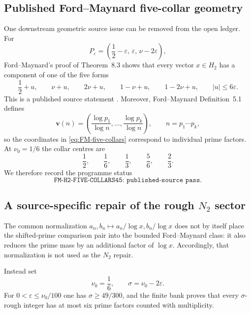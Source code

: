 \documentclass[11pt]{article}
\theoremstyle{definition}
\newcommand{\1}{\mathbf 1}
\begin{document}
\subsection{Published Ford--Maynard five-collar geometry}
One downstream geometric source issue can be removed from the open ledger.
For
\[
   P_\varepsilon=
   \left(\frac12-\varepsilon,\,
         \varepsilon,\,
         \nu-2\varepsilon\right),
\]
Ford--Maynard's proof of Theorem~8.3 shows that every vector
$x\in H_2$ has a component of one of the five forms
\begin{equation}
 \frac12+u,\qquad
 \nu+u,\qquad
 2\nu+u,\qquad
 1-\nu+u,\qquad
 1-2\nu+u,
 \qquad |u|\le 6\varepsilon.
 \label{eq:FM-five-collars}
\end{equation}
This is a published source statement \cite{FordMaynard2024}.  Moreover,
Ford--Maynard Definition~5.1 defines
\[
   \mathbf v(n)=
   \left(
     \frac{\log p_1}{\log n},\ldots,
     \frac{\log p_k}{\log n}
   \right),
   \qquad n=p_1\cdots p_k,
\]
so the coordinates in \eqref{eq:FM-five-collars} correspond to individual
prime factors.  At $\nu_0=1/6$ the collar centres are
\[
   \frac12,\qquad \frac16,\qquad \frac13,\qquad
   \frac56,\qquad \frac23.
\]
We therefore record the programme status
\[
   \boxed{\texttt{FM-H2-FIVE-COLLARS45: published-source pass}.}
\]

\subsection{A source-specific repair of the rough \texorpdfstring{$N_2$}{N2} sector}
The common normalization $a_n,b_n\mapsto a_n/\log x,b_n/\log x$ does not by
itself place the shifted-prime comparison pair into the bounded Ford--Maynard
class: it also reduces the prime mass by an additional factor of $\log x$.
Accordingly, that normalization is not used as the $N_2$ repair.

Instead set
\[
   \nu_0=\frac16,\qquad \sigma=\nu_0-2\varepsilon.
\]
For $0<\varepsilon\le \nu_0/100$ one has
$\sigma\ge49/300$, and the finite bank proves that every $\sigma$-rough
integer has at most six prime factors counted with multiplicity.
\end{document}

